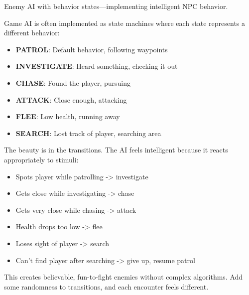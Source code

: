 Enemy AI with behavior states---implementing intelligent NPC behavior.

Game AI is often implemented as state machines where each state represents a different behavior:

\begin{itemize}
    \item \textbf{PATROL}: Default behavior, following waypoints
    \item \textbf{INVESTIGATE}: Heard something, checking it out
    \item \textbf{CHASE}: Found the player, pursuing
    \item \textbf{ATTACK}: Close enough, attacking
    \item \textbf{FLEE}: Low health, running away
    \item \textbf{SEARCH}: Lost track of player, searching area
\end{itemize}

The beauty is in the transitions. The AI feels intelligent because it reacts appropriately to stimuli:
\begin{itemize}
    \item Spots player while patrolling -> investigate
    \item Gets close while investigating -> chase
    \item Gets very close while chasing -> attack
    \item Health drops too low -> flee
    \item Loses sight of player -> search
    \item Can't find player after searching -> give up, resume patrol
\end{itemize}

This creates believable, fun-to-fight enemies without complex algorithms. Add some randomness to transitions, and each encounter feels different.

